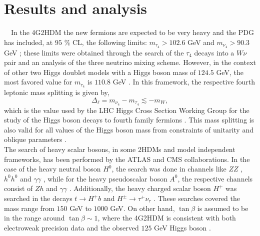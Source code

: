 \documentclass[a4paper]{jpconf}
\begin{document}
\section{Results and analysis}
\ \
In the 4G2HDM the new fermions are expected to be very heavy and the PDG has included, at $95$ \% CL, the following limits: $m_{\tau_4} > 102.6$ GeV and $m_{\nu_4} > 90.3$ GeV \cite{Olive:2016xmw}; these limits were obtained through the search of the $\tau_4$ decays into a $W \nu  $ pair and an analysis of the three neutrino mixing scheme. However, in the context of other two Higgs doublet models with a Higgs boson mass of $ 124.5 $ GeV, the most favored value for $m_{\tau_4}$ is $110.8$ GeV \cite{Bellantoni:2012ag}. In this framework, the respective fourth leptonic mass splitting is given by,
\begin{equation}\label{splitting}
\Delta_{\ell}=m_{\nu_4}-m_{\tau_4} \lesssim  - m_W,
\end{equation}
which is the value used by the LHC Higgs Cross Section Working Group for the study of  the Higgs boson decays to fourth family fermions \cite{Denner:2011vt,Eberhardt:2012ck}. This mass splitting is also valid for all values of the Higgs boson mass from constraints of unitarity and oblique parameters \cite{Dighe:2012dz}.\\
 The search of heavy scalar bosons, in some 2HDMs and model independent frameworks, has been performed by the ATLAS \cite{Aad:2012rjx,Aad:2015wra,Aad:2015kna} and CMS \cite{Khachatryan:2014jya,Khachatryan:2015lba,Khachatryan:2015qba,Khachatryan:2015qxa,Khachatryan:2015tha} collaborations. In the case of the
heavy  neutral boson $ H^{0} $, the search was done in channels like $ ZZ $ \cite{Aad:2015kna}, $ h^0h^0$ \cite{Khachatryan:2014jya,Khachatryan:2015tha}  and $ \gamma\gamma$ \cite{Khachatryan:2015qba}, while for the heavy pseudoscalar boson $ A^{0} $, the respective channels consist of  $Zh$\cite{Khachatryan:2014jya,Aad:2015wra,Khachatryan:2015lba,Khachatryan:2015tha} and $ \gamma\gamma$ \cite{Khachatryan:2015qba}. Additionally, the heavy charged scalar boson $ H^{+} $ was searched in the decays  $t\to H^+ b$ \cite{Aad:2012rjx,Akeroyd2017,Khachatryan:2015qxa} and $H^\pm \to \tau^+ \nu_\tau$ \cite{Khachatryan:2015qxa}. These searches covered the mass range from $150  $ GeV to $ 1000 $ GeV. On other hand, $\tan\beta$ is assumed to be in the range around $\tan\beta\sim1$, where the 4G2HDM is consistent with both electroweak precision data \cite{BarShalom:2011zj} and the observed $125$ GeV Higgs boson \cite{Geller:2012tg}. \\
\end{document}

